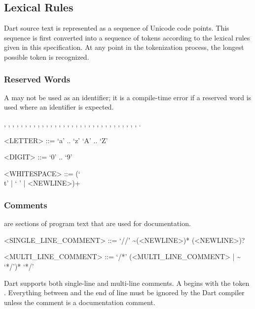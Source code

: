 \documentclass[makeidx]{article}
\begin{document}
{\subsection{Lexical Rules}

\LMHash{}%
Dart source text is represented as a sequence of Unicode code points.
This sequence is first converted into a sequence of tokens according to the lexical rules given in this specification.
At any point in the tokenization process, the longest possible token is recognized.


\subsubsection{Reserved Words}

\LMHash{}%
A  may not be used as an identifier; it is a compile-time error if a reserved word is used where an identifier is expected.

\ASSERT{}, \BREAK{}, \CASE{}, \CATCH{}, \CLASS{}, \CONST{}, \CONTINUE{}, \DEFAULT{}, \DO{}, \ELSE{}, \ENUM{}, \EXTENDS{}, \FALSE{}, \FINAL{}, \FINALLY{}, \FOR{}, \IF{}, \IN{}, \IS{}, \NEW{}, \NULL{}, \RETHROW, \RETURN{}, \SUPER{}, \SWITCH{}, \THIS{}, \THROW{}, \TRUE{}, \TRY{}, \VAR{}, \VOID{}, \WHILE{}, \WITH{}.

\begin{grammar}
<LETTER> ::= `a' .. `z'
  \alt `A' .. `Z'

<DIGIT> ::= `0' .. `9'

<WHITESPACE> ::= (`\\t' | ` ' | <NEWLINE>)+
\end{grammar}


\subsubsection{Comments}

\LMHash{}%
are sections of program text that are used for documentation.

\begin{grammar}
<SINGLE\_LINE\_COMMENT> ::= `//' \~{}(<NEWLINE>)* (<NEWLINE>)?

<MULTI\_LINE\_COMMENT> ::= \gnewline{}
  `/*' (<MULTI\_LINE\_COMMENT> | \~{} `*/')* `*/'
\end{grammar}

\LMHash{}%
Dart supports both single-line and multi-line comments.
A  begins with the token \code{//}.
Everything between \code{//} and the end of line must be ignored by the Dart compiler unless the comment is a documentation comment.

}
\end{document}
